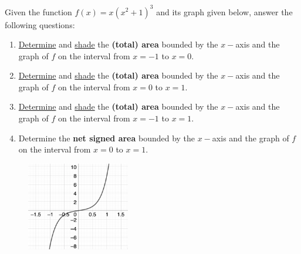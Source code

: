 \begin{example}
Given the function $f(x)=x(x^2+1)^3$ and its graph given below, answer the following questions: 
\renewcommand{\labelenumi}{\textbf{(\alph{enumi})}}
\begin{enumerate}[leftmargin=*]
    \item \underline{Determine} and \underline{shade} the \textbf{(total) area} bounded by the $x-$axis and the graph of $f$ on the interval from $x=-1$ to $x=0$. 
    \item \underline{Determine} and \underline{shade} the \textbf{(total) area} bounded by the $x-$axis and the graph of $f$ on the interval from $x=0$ to $x=1$. 
     \item \underline{Determine} and \underline{shade} the \textbf{(total) area} bounded by the $x-$axis and the graph of $f$ on the interval from $x=-1$ to $x=1$. 
    \item Determine the \textbf{net signed area} bounded by the $x-$axis and the graph of $f$ on the interval from $x=0$ to $x=1$.
\end{enumerate}
 
\begin{figure}[h!]
        \includegraphics[width=0.4\textwidth,inner]{images/defIntgArea/areaEx3.png}
        \captionsetup{justification=justified, singlelinecheck=false}
        \label{fig:areaEx2}
\end{figure}

    

\end{example}
